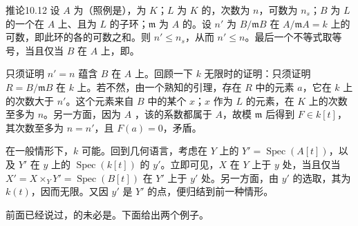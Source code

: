 \begin{SGAresult}{推论}{10.12}
设 $A$ 为（照例是），为 $K$；$L$ 为 $K$ 的，次数为 $n$，可数为 $n_s$；$B$ 为 $L$ 的一个在 $A$ 上、且为 $L$ 的子环；$\mathfrak m$ 为 $A$ 的。设 $n'$ 为 $B/\mathfrak m B$ 在 $A/\mathfrak m A=k$ 上的可数，即此环的各的可数之和。则 $n'\leq n_s$，从而 $n'\leq n$。最后一个不等式取等号，当且仅当 $B$ 在 $A$ 上，即。
\end{SGAresult}
只须证明 $n'=n$ 蕴含 $B$ 在 $A$ 上。回顾一下 $k$ 无限时的证明：只须证明 $R=B/\mathfrak m B$ 在 $k$ 上。若不然，由一个熟知的引理，存在 $R$ 中的元素 $a$，它在 $k$ 上的次数大于 $n'$。这个元素来自 $B$ 中的某个 $x$；$x$ 作为 $L$ 的元素，在 $K$ 上的次数至多为 $n$。另一方面，因为 $A$ ，该的系数都属于 $A$，故模 $\mathfrak m$ 后得到 $F\in k[t]$，其次数至多为 $n=n'$，且 $F(a)=0$，矛盾。

在一般情形下，$k$ 可能。回到几何语言，考虑在 $Y$ 上的 $Y'=\operatorname{Spec}(A[t])$，以及 $Y'$ 在 $y$ 上的 $\operatorname{Spec}(k[t])$ 的 $y'$。立即可见，$X$ 在 $Y$ 上于 $y$ 处，当且仅当 $X'=X\times_Y Y'=\operatorname{Spec}(B[t])$ 在 $Y'$ 上于 $y'$ 处。另一方面，由 $y'$ 的选取，其为 $k(t)$，因而无限。又因 $y'$ 是 $Y'$ 的点，便归结到前一种情形。

前面已经说过，的未必是。下面给出两个例子。

